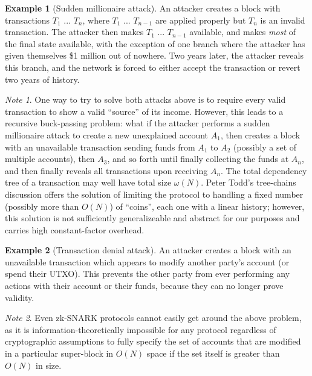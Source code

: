 \documentclass[11pt,a4paper]{article}
\theoremstyle{plain}
\theoremstyle{definition}
\newtheorem{exmp}{Example}[section]
\theoremstyle{remark}
\newtheorem*{note}{Note}
\begin{document}
\begin{exmp}[Sudden millionaire attack]
An attacker creates a block with transactions $T_1$ ... $T_n$, where $T_1$ ... $T_{n-1}$ are applied properly but $T_n$ is an invalid transaction. The attacker then makes $T_1$ ... $T_{n-1}$ available, and makes \emph{most} of the final state available, with the exception of one branch where the attacker has given themselves \$1 million out of nowhere. Two years later, the attacker reveals this branch, and the network is forced to either accept the transaction or revert two years of history.
\end{exmp}

\begin{note}
One way to try to solve both attacks above is to require every valid transaction to show a valid ``source'' of its income. However, this leads to a recursive buck-passing problem: what if the attacker performs a sudden millionaire attack to create a new unexplained account $A_1$, then creates a block with an unavailable transaction sending funds from $A_1$ to $A_2$ (possibly a set of multiple accounts), then $A_3$, and so forth until finally collecting the funds at $A_n$, and then finally reveals all transactions upon receiving $A_n$. The total dependency tree of a transaction may well have total size $\omega(N)$. Peter Todd's tree-chains discussion offers the solution\cite{treechains} of limiting the protocol to handling a fixed number (possibly more than $O(N)$) of ``coins'', each one with a linear history; however, this solution is not sufficiently generalizeable and abstract for our purposes and carries high constant-factor overhead.
\end{note}

\begin{exmp}[Transaction denial attack]
An attacker creates a block with an unavailable transaction which appears to modify another party's account (or spend their UTXO). This prevents the other party from ever performing any actions with their account or their funds, because they can no longer prove validity.
\end{exmp}

\begin{note}
Even zk-SNARK protocols cannot easily get around the above problem, as it is information-theoretically impossible for any protocol regardless of cryptographic assumptions to fully specify the set of accounts that are modified in a particular super-block in $O(N)$ space if the set itself is greater than $O(N)$ in size.
\end{note}
\end{document}
